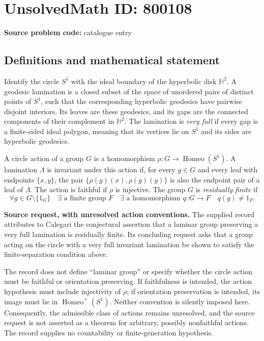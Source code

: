 \documentclass[11pt]{article}
\begin{document}
\section*{UnsolvedMath ID: 800108}
\textbf{Source problem code:} catalogue entry
\subsection{Definitions and mathematical statement}
Identify the circle \(S^1\) with the ideal boundary of the hyperbolic disk \(\mathbb H^2\). A geodesic lamination is a closed subset of the space of unordered pairs of distinct points of \(S^1\), such that the corresponding hyperbolic geodesics have pairwise disjoint interiors. Its leaves are these geodesics, and its gaps are the connected components of their complement in \(\mathbb H^2\). The lamination is \emph{very full} if every gap is a finite-sided ideal polygon, meaning that its vertices lie on \(S^1\) and its sides are hyperbolic geodesics.

A circle action of a group \(G\) is a homomorphism \(\rho:G\to\operatorname{Homeo}(S^1)\). A lamination \(\Lambda\) is invariant under this action if, for every \(g\in G\) and every leaf with endpoints \(\{x,y\}\), the pair \(\{\rho(g)(x),\rho(g)(y)\}\) is also the endpoint pair of a leaf of \(\Lambda\). The action is faithful if \(\rho\) is injective. The group \(G\) is \emph{residually finite} if
\[
\forall g\in G\setminus\{1_G\}\quad
\exists\text{ a finite group }F\quad
\exists\text{ a homomorphism }q:G\to F
\quad q(g)\ne 1_F.
\]

\textbf{Source request, with unresolved action conventions.} The supplied record attributes to Calegari the conjectural assertion that a laminar group preserving a very full lamination is residually finite. Its concluding request asks that a group acting on the circle with a very full invariant lamination be shown to satisfy the finite-separation condition above.

The record does not define ``laminar group'' or specify whether the circle action must be faithful or orientation preserving. If faithfulness is intended, the action hypothesis must include injectivity of \(\rho\); if orientation preservation is intended, its image must lie in \(\operatorname{Homeo}^{+}(S^1)\). Neither convention is silently imposed here. Consequently, the admissible class of actions remains unresolved, and the source request is not asserted as a theorem for arbitrary, possibly nonfaithful actions. The record supplies no countability or finite-generation hypothesis.
\end{document}
